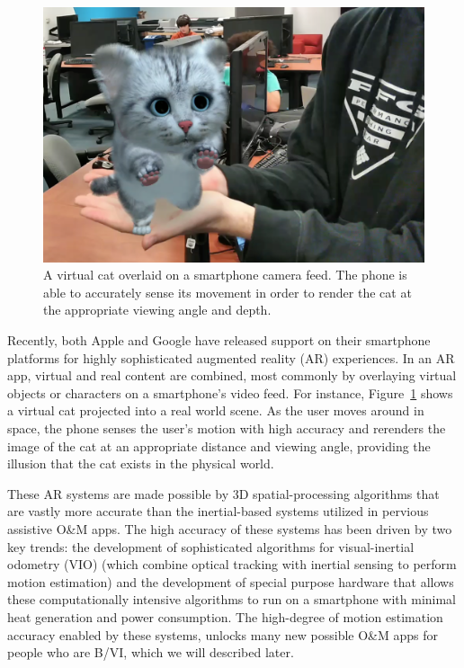 \documentclass[chi_draft]{sigchi}
\newcommand{\BVI}{B/VI\xspace}
\newcommand{\OM}{O\&M\xspace}
\begin{document}
\begin{figure}
\begin{center}
\includegraphics[width=.9\linewidth]{Figures/arexample.png}
\end{center}
\caption{A virtual cat overlaid on a smartphone camera feed.  The phone is able to accurately sense its movement in order to render the cat at the appropriate viewing angle and depth.\label{fig:arexample}}
\end{figure}

Recently, both Apple and Google have released support on their smartphone platforms for highly sophisticated augmented reality (AR) experiences.  In an AR app, virtual and real content are combined, most commonly by overlaying virtual objects or characters on a smartphone's video feed.  For instance, Figure~\ref{fig:arexample} shows a virtual cat projected into a real world scene.  As the user moves around in space, the phone senses the user's motion with high accuracy and rerenders the image of the cat at an appropriate distance and viewing angle, providing the illusion that the cat exists in the physical world.

These AR systems are made possible by 3D spatial-processing algorithms that are vastly more accurate than the inertial-based systems utilized in pervious assistive \OM apps.  The high accuracy of these systems has been driven by two key trends: the development of sophisticated algorithms for visual-inertial odometry (VIO) \cite{li2013high,leutenegger2015keyframe,bloesch2015robust,forster2014svo} (which combine optical tracking with inertial sensing to perform motion estimation) and the development of special purpose hardware that allows these computationally intensive algorithms to run on a smartphone with minimal heat generation and power consumption.  The high-degree of motion estimation accuracy enabled by these systems, unlocks many new possible \OM apps for people who are \BVI, which we will described later.
\end{document}
